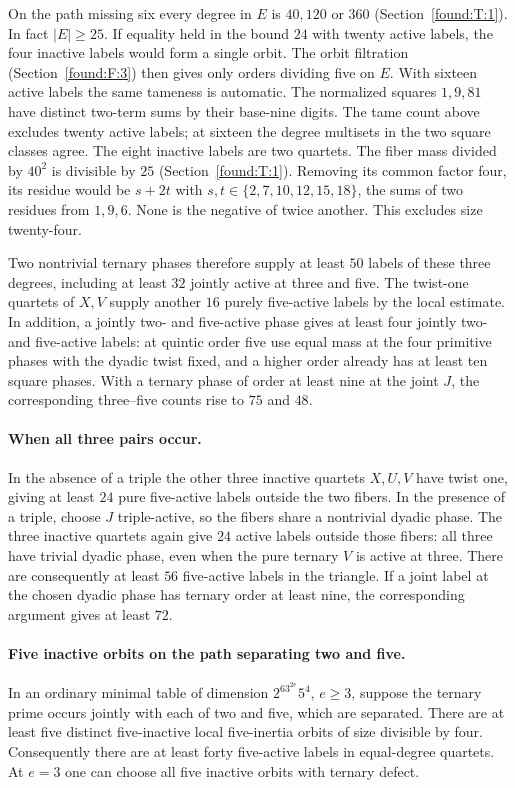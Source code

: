 \documentclass[11pt,a4paper]{article}
\numberwithin{equation}{section}
\theoremstyle{remark}
\begin{document}
On the path missing six every degree in $E$ is $40,120$ or $360$ (Section~\ref{found:T:1}). In fact $|E|\ge25$. If equality held in the bound $24$ with twenty active labels, the four inactive labels would form a single orbit. The orbit filtration (Section~\ref{found:F:3}) then gives only orders dividing five on $E$. With sixteen active labels the same tameness is automatic. The normalized squares $1,9,81$ have distinct two-term sums by their base-nine digits. The tame count above excludes twenty active labels; at sixteen the degree multisets in the two square classes agree. The eight inactive labels are two quartets. The fiber mass divided by $40^2$ is divisible by $25$ (Section~\ref{found:T:1}). Removing its common factor four, its residue would be $s+2t$ with $s,t\in\{2,7,10,12,15,18\}$, the sums of two residues from $1,9,6$. None is the negative of twice another. This excludes size twenty-four.

Two nontrivial ternary phases therefore supply at least $50$ labels of these three degrees, including at least $32$ jointly active at three and five. The twist-one quartets of $X,V$ supply another $16$ purely five-active labels by the local estimate. In addition, a jointly two- and five-active phase gives at least four jointly two- and five-active labels: at quintic order five use equal mass at the four primitive phases with the dyadic twist fixed, and a higher order already has at least ten square phases. With a ternary phase of order at least nine at the joint $J$, the corresponding three--five counts rise to $75$ and $48$.

\paragraph{When all three pairs occur.}\label{por:triangle-fibers}
In the absence of a triple the other three inactive quartets $X,U,V$ have twist one, giving at least $24$ pure five-active labels outside the two fibers. In the presence of a triple, choose $J$ triple-active, so the fibers share a nontrivial dyadic phase. The three inactive quartets again give $24$ active labels outside those fibers: all three have trivial dyadic phase, even when the pure ternary $V$ is active at three. There are consequently at least $56$ five-active labels in the triangle. If a joint label at the chosen dyadic phase has ternary order at least nine, the corresponding argument gives at least $72$.

\paragraph{Five inactive orbits on the path separating two and five.}\label{por:five-inactive-orbits}
In an ordinary minimal table of dimension $2^63^{2e}5^4$, $e\ge3$, suppose the ternary prime occurs jointly with each of two and five, which are separated. There are at least five distinct five-inactive local five-inertia orbits of size divisible by four. Consequently there are at least forty five-active labels in equal-degree quartets. At $e=3$ one can choose all five inactive orbits with ternary defect.
\end{document}
